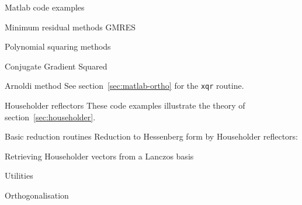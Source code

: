 \documentclass[11pt]{artikel3}
\begin{document}
\begin{Outline}
\begin{comment}
We have presented the conjugate gradient-like methods
in a matrix framework. A~clear separation between the
Hessenberg matrix associated with Krylov sequences, orthogonalization
under different inner products, preconditioning,
and minimization properties was made. Facts normally taken for
granted, such as the three-term form of recurrences, or the fact
that these methods can
be used for iterative solution of linear systems, were derived,
not taken as a premise.
Additionally, we have
shown how cg methods can be considered as polynomial
accelerations of basic stationary iterative method.

Using the matrix framework for talking about vector sequences, we have
given short derivations of the conjugate gradients method, both for
symmetric and unsymmetric systems, the Lanczos algorithm and the equivalent
biconjugate gradient method, the least squares methods GMRES and QMR
and the conjugate gradients squared method. 
\end{comment}

\newpage




\newpage

\appendix
{} {Matlab code examples}

 {Minimum residual methods}
 {GMRES}
\label{sec:matlab-gmres}


 {Polynomial squaring methods}
\label{sec:matlab-cgs}

 {Conjugate Gradient Squared}


 {Arnoldi method}
\label{sec:matlab-arnoldi}
See section~\ref{sec:matlab-ortho} for the {\tt xqr} routine.


 {Householder reflectors}
\label{sec:matlab-householder}
These code examples illustrate the theory of section~\ref{sec:householder}.

 {Basic reduction routines}
Reduction to Hessenberg form by Householder reflectors:




 {Retrieving Householder vectors from a Lanczos basis}


 {Utilities}

 {Orthogonalisation}
\label{sec:matlab-ortho}


\printindex

\end{Outline}
\end{document}
